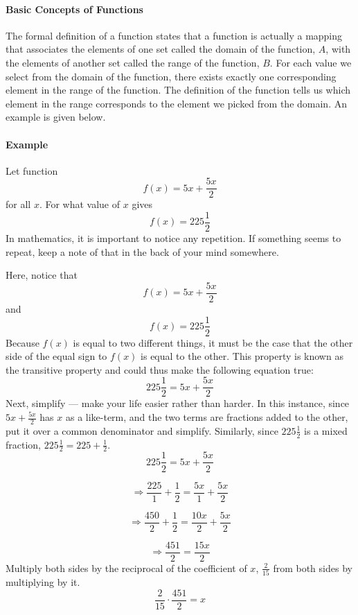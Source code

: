 \paragraph{Basic Concepts of Functions}

The formal definition of a function states that a function is actually a mapping that associates the elements of one set called the domain of the function, $A$, with the elements of another set called the range of the function, $B$. For each value we select from the domain of the function, there exists exactly one corresponding element in the range of the function. The definition of the function tells us which element in the range corresponds to the element we picked from the domain. An example is given below.

\paragraph{Example}

Let function
$$
f(x) = 5x + \frac{5x}{2}
$$
for all $x$. For what value of $x$ gives 
$$
f(x) = 225 \frac{1}{2}
$$
In mathematics, it is important to notice any repetition. If something seems to repeat, keep a note of that in the back of your mind somewhere.

Here, notice that 
$$
f(x) = 5x + \frac{5x}{2}
$$
and 
$$
f(x) = 225 \frac{1}{2}
$$
Because $f(x)$ is equal to two different things, it must be the case that the other side of the equal sign to $f(x)$ is equal to the other. This property is known as the transitive property and could thus make the following equation true:
$$
225 \frac{1}{2} = 5x + \frac{5x}{2}
$$
Next, simplify — make your life easier rather than harder. In this instance, since $5x + \frac{5x}{2}$ has $x$ as a like-term, and the two terms are fractions added to the other, put it over a common denominator and simplify. Similarly, since $225 \frac{1}{2}$ is a mixed fraction, $225 \frac{1}{2} = 225 + \frac{1}{2}$.
$$
225 \frac{1}{2} = 5x + \frac{5x}{2}
$$

$$
\Rightarrow \frac{225}{1} + \frac{1}{2} = \frac{5x}{1} + \frac{5x}{2}
$$

$$
\Rightarrow \frac{450}{2} + \frac{1}{2} = \frac{10x}{2} + \frac{5x}{2}
$$

$$
\Rightarrow \frac{451}{2} = \frac{15x}{2}
$$
Multiply both sides by the reciprocal of the coefficient of $x$, $\frac{2}{15}$ from both sides by multiplying by it.
$$
\frac{2}{15} \cdot \frac{451}{2} = x
$$

